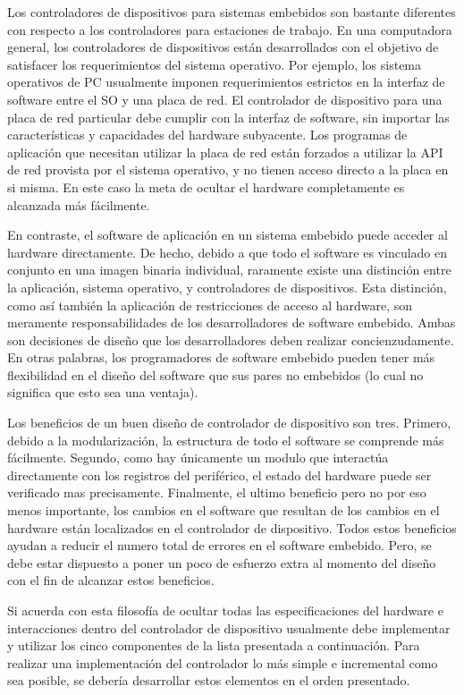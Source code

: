 \documentclass[12pt]{article}
\begin{document}
Los controladores de dispositivos para sistemas embebidos son bastante
diferentes con respecto a los controladores para estaciones de trabajo.
En una computadora general, los controladores de dispositivos están
desarrollados con el objetivo de satisfacer los requerimientos del sistema
operativo. Por ejemplo, los sistema operativos de PC usualmente imponen
requerimientos estrictos en la interfaz de software entre el SO y una
placa de red. El controlador de dispositivo para una placa de red particular
debe cumplir con la interfaz de software, sin importar las características
y capacidades del hardware subyacente. Los programas de aplicación que 
necesitan utilizar la placa de red están forzados a utilizar la API
de red provista por el sistema operativo, y no tienen acceso directo a la
placa en si misma. En este caso la meta de ocultar el hardware completamente
es alcanzada más fácilmente.

En contraste, el software de aplicación en un sistema embebido  puede acceder al
hardware directamente. De hecho, debido a que todo el software es
vinculado en conjunto en una imagen binaria individual, raramente existe
una
distinción entre la aplicación, sistema operativo, y controladores
de dispositivos.
Esta distinción, como así también la aplicación de restricciones de acceso 
al hardware,
son meramente responsabilidades de los desarrolladores de software embebido.
Ambas son decisiones de diseño que los desarrolladores deben realizar
concienzudamente. En otras palabras, los programadores de software 
embebido pueden tener más flexibilidad en el diseño del software
que sus pares no embebidos (lo cual no significa que esto sea
una ventaja).

Los beneficios de un buen diseño de controlador de dispositivo son tres.
Primero, debido a la modularización, la estructura de todo el software
se comprende más fácilmente. Segundo, como hay únicamente un modulo 
que interactúa directamente con los registros del periférico, el estado
del hardware puede ser verificado mas precisamente. Finalmente, el ultimo 
beneficio pero no por eso menos importante, los cambios en el software que
resultan de los cambios en el hardware están localizados en el controlador
de dispositivo. Todos estos beneficios ayudan a reducir el numero total
de errores en el software embebido.
Pero, se debe estar dispuesto a
poner un poco de esfuerzo extra al momento del diseño con el fin de 
alcanzar estos beneficios.

Si acuerda con esta filosofía de ocultar todas las especificaciones del hardware
e interacciones dentro del controlador de dispositivo usualmente debe 
implementar y utilizar los cinco componentes de la lista presentada a continuación.
Para realizar una implementación del controlador lo más simple e incremental
como sea posible, se debería desarrollar estos elementos en el orden
presentado.
\end{document}
